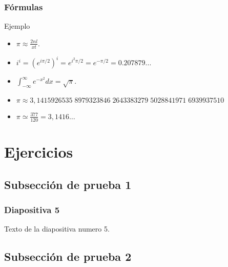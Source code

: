 \documentclass{beamer}
\begin{document}
\begin{frame}

\frametitle{Fórmulas}

\begin{block}{Ejemplo}
  \begin{itemize}
  \item
  $\pi \approx \frac{2nl}{xt}.$
  \pause

  \item
  $i^i=\left(e^{i\pi /2}\right)^i=e^{i^2\pi /2}=e^{-\pi /2}=0.207879...$
  \pause

  \item
  $\int_{-\infty}^{\infty}e^{-x^2}dx=\sqrt{\pi}.$
  
  \pause

  \item
  $\pi \approx 3,1415926535 \; 8979323846 \; 2643383279 \; 5028841971 \; 6939937510$
  \pause

  \item
  $\pi \simeq \frac{377}{120} = 3{,}1416 \ldots$
  \pause
  
  \end{itemize}
\end{block}

\end{frame}

\section{Ejercicios}

\subsection{Subsección de prueba 1}
\begin{frame}
\frametitle{Diapositiva 5}

Texto de la diapositiva \alert{numero 5.}\cite{beamer}
\end{frame}

\subsection{Subsección de prueba 2}
\end{document}

